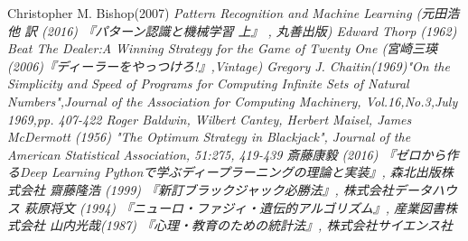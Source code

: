 \begin{thebibliography}{9}
   Christopher M. Bishop(2007) \it{Pattern Recognition and Machine Learning} (元田浩 他 訳 (2016) 『パターン認識と機械学習 上』 , 丸善出版)
   Edward Thorp (1962) \it{Beat The Dealer:A Winning Strategy for the Game of Twenty One} (宮崎三瑛(2006)『ディーラーをやっつけろ!』,Vintage)
   Gregory J. Chaitin(1969)"On the Simplicity and Speed of Programs for Computing Infinite Sets of Natural Numbers",Journal of the Association for Computing Machinery, Vol.16,No.3,July 1969,pp. 407-422
   Roger Baldwin, Wilbert Cantey, Herbert Maisel, James McDermott (1956) "The Optimum Strategy in Blackjack", Journal of the American Statistical Association, 51:275, 419-439
   斎藤康毅 (2016) 『ゼロから作るDeep Learning Pythonで学ぶディープラーニングの理論と実装』, 森北出版株式会社
   齋藤隆浩 (1999) 『新訂ブラックジャック必勝法』, 株式会社データハウス
   萩原将文 (1994) 『ニューロ・ファジィ・遺伝的アルゴリズム』, 産業図書株式会社
   山内光哉(1987) 『心理・教育のための統計法』, 株式会社サイエンス社
\end{thebibliography}
